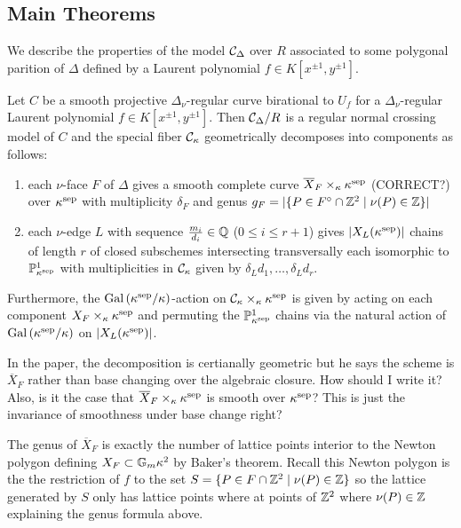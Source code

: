 \documentclass[12pt]{article}
\begin{document}
\subsection{Main Theorems}

We describe the properties of the model $\mathcal{C}_\Delta$ over $R$ associated to some polygonal parition of $\Delta$ defined by a Laurent polynomial $f \in K[x^{\pm 1}, y^{\pm 1}]$. 

\begin{theorem}[DK, Thm. 3.13]
Let $C$ be a smooth projective $\Delta_\nu$-regular curve birational to $U_f$ for a $\Delta_\nu$-regular Laurent polynomial $f \in K[x^{\pm 1}, y^{\pm 1}]$. Then $\mathcal{C}_\Delta / R$ is a regular normal crossing model of $C$ and the special fiber $\mathcal{C}_\kappa$ geometrically decomposes into components as follows:
\begin{enumerate}
\item each $\nu$-face $F$ of $\Delta$ gives a smooth complete curve $\overline{X}_F \times_\kappa \kappa^{\mathrm{sep}}$ (CORRECT?) over $\kappa^{\mathrm{sep}}$ with multiplicity $\delta_F$ and genus $g_F = |\{ P \in F^\circ \cap \mathbb{Z}^2 \mid \nu(P) \in \mathbb{Z} \} |$
\item each $\nu$-edge $L$ with sequence $\frac{m_i}{d_i} \in \mathbb{Q}$ ($0 \le i \le r + 1$) gives $|X_L(\kappa^{\mathrm{sep}})|$ chains of length $r$ of closed subschemes intersecting transversally each isomorphic to $\mathbb{P}^1_{\kappa^{\mathrm{sep}}}$ with multiplicities in $\mathcal{C}_\kappa$ given by $\delta_L d_1, \dots, \delta_L d_r$.
\end{enumerate}
Furthermore, the $\mathrm{Gal}\left( \kappa^{\mathrm{sep}} / \kappa \right)$-action on $\mathcal{C}_{\kappa} \times_\kappa \kappa^{\mathrm{sep}}$ is given by acting on each component $X_F \times_\kappa \kappa^{\mathrm{sep}}$ and permuting the $\mathbb{P}^1_{\kappa^{\mathrm{sep}}}$ chains via the natural action of $\mathrm{Gal}\left( \kappa^{\mathrm{sep}} / \kappa \right)$ on $|X_L(\kappa^{\mathrm{sep}})|$. 
\end{theorem}

\begin{question}
In the paper, the decomposition is certianally geometric but he says the scheme is $\overline{X}_F$ rather than base changing over the algebraic closure. How should I write it? Also, is it the case that $\overline{X}_F \times_\kappa \kappa^{\mathrm{sep}}$ is smooth over $\kappa^{\mathrm{sep}}$? This is just the invariance of smoothness under base change right?
\end{question}

\begin{rmk}
The genus of $\overline{X}_F$ is exactly the number of lattice points interior to the Newton polygon defining $X_F \subset \mathbb{G}_m{\kappa}^2$ by Baker's theorem. Recall this Newton polygon is the the restriction of $f$ to the set $S = \{ P \in F \cap \mathbb{Z}^2 \mid \nu(P) \in \mathbb{Z} \}$ so the lattice generated by $S$ only has lattice points where at points of $\mathbb{Z}^2$ where $\nu(P) \in \mathbb{Z}$ explaining the genus formula above. 
\end{rmk}
\end{document}
